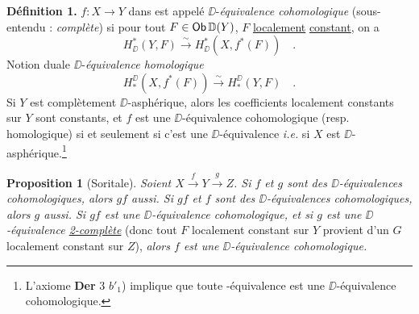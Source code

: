 \textbf{Définition 1.} $f : X \to Y$ dans \Dia{} est appelé $\DD$-\textit{équivalence cohomologique} (sous-entendu : \textit{complète}) si pour tout $F \in \mathsf{Ob}\,\mathbb{D}(Y)$, $F$ \underline{localement} \underline{constant}, on a
\[
H^*_{\DD}(Y,F) \overset{\sim}{\longrightarrow} H^*_{\DD}(X, f^*(F)) \quad .
\]
Notion duale $\DD$-\textit{équivalence homologique}
\[
H_*^{\DD}(X, f^*(F)) \overset{\sim}{\longrightarrow} H_*^{\DD}(Y,F) \quad .
\]
Si $Y$ est complètement $\DD$-asphérique, alors les coefficients localement constants sur $Y$ sont constants, et $f$ est une $\DD$-équivalence cohomologique (resp. homologique) si et seulement si c’est une $\DD$-équivalence \textit{i.e.} si $X$ est $\DD$-asphérique.\footnote[53]{L’axiome \textbf{Der} 3 $b'_1$) implique que toute \Hot-équivalence est une $\DD$-équivalence cohomologique.}

\textbf{Proposition 1} (Soritale). \textit{Soient $X \overset{f}{\to} Y \overset{g}{\to} Z$. Si $f$ et $g$ sont des $\DD$-équivalences cohomologiques, alors $gf$ aussi. Si $gf$ et $f$ sont des $\DD$-équivalences cohomologiques, alors $g$ aussi. Si $gf$ est une $\DD$-équivalence cohomologique, et si $g$ est une $\DD$-équivalence \underline{2-complète}} (donc tout $F$ localement constant sur $Y$ provient d’un $G$ localement constant sur $Z$), \textit{alors $f$ est une $\DD$-équivalence cohomologique.}

